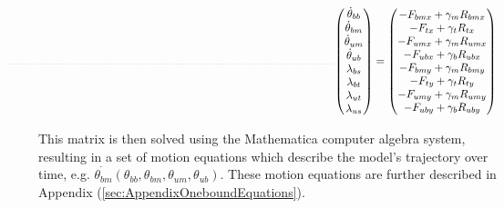 \documentclass[9pt,twoside,lineno]{pnas-new}
\begin{document}
\setstacktabbedgap{4pt}
{\tiny
  \[
  \hspace{-1.0cm}
  \resizebox{0.85\linewidth}{!}{%
    $\parenMatrixstack{
      L_s\sin\theta_{bb} & 0 & 0 & 0 & -\gamma_m (X_{bm} - X_{bb}) & \gamma_m (X_{t } - X_{bm}) & 0 & 0 \cr
      L_s\sin(\theta_{bb}) & L_t\sin(\theta_{bm}) & 0 & 0 & 0 & -\gamma_t (X_{t } - X_{bm}) & \gamma_t (X_{um} - X_{t }) & 0 \cr
      L_s\sin(\theta_{bb}) & L_t\sin(\theta_{bm}) & -L_t\sin(\theta_{um}) & 0 & 0 & 0 & -\gamma_m (X_{um} - X_{t }) & \gamma_m (X_{ub} - X_{um}) \cr
      L_s\sin(\theta_{bb}) & L_t\sin(\theta_{bm}) & -L_t\sin(\theta_{um}) & -L_s\sin(\theta_{ub}) & 0 & 0 & 0 & -\gamma_b (X_{ub} - X_{um}) \cr
      -L_s\cos(\theta_{bb}) & 0 & 0 & 0 & -\gamma_m (Y_{bm} - Y_{bb}) & \gamma_m (Y_{t } - Y_{bm}) & 0 & 0 \cr
      -L_s\cos(\theta_{bb}) & -L_t\cos(\theta_{bm}) & 0 & 0 & 0 & -\gamma_t (Y_{t } - Y_{bm}) & \gamma_t (Y_{um} - Y_{t }) & 0 \cr
      -L_s\cos(\theta_{bb}) & -L_t\cos(\theta_{bm}) & L_t\cos(\theta_{um}) & 0 & 0 & 0 & -\gamma_m (Y_{um} - Y_{t }) & \gamma_m (Y_{ub} - Y_{um}) \cr
      -L_s\cos(\theta_{bb}) & -L_t\cos(\theta_{bm}) & L_t\cos(\theta_{um}) & L_s\cos(\theta_{ub}) & 0 & 0 & 0 & -\gamma_b (Y_{ub} - Y_{um})
      }$%
    }
  \begin{pmatrix}
    \dot{\theta}_{bb}\\
    \dot{\theta}_{bm}\\
    \dot{\theta}_{um}\\
    \dot{\theta}_{ub}\\
    \lambda_{bs}\\
    \lambda_{bt}\\
    \lambda_{ut}\\
    \lambda_{us}\\
  \end{pmatrix}
  =
  \begin{pmatrix}
    -F_{bmx} + \gamma_m R_{bmx}\\
    -F_{tx} + \gamma_t R_{tx}\\
    -F_{umx} + \gamma_m R_{umx}\\
    -F_{ubx} + \gamma_b R_{ubx}\\
    -F_{bmy} + \gamma_m R_{bmy}\\
    -F_{ty} + \gamma_t R_{ty}\\
    -F_{umy} + \gamma_m R_{umy}\\
    -F_{uby} + \gamma_b R_{uby}\\
  \end{pmatrix}
  \]
}

This matrix is then solved using the Mathematica computer algebra system, resulting in a set of motion equations which describe the model's trajectory over time, e.g. $\dot{\theta_{bm}}(\theta_{bb}, \theta_{bm}, \theta_{um}, \theta_{ub})$. These motion equations are further described in Appendix (\ref{sec:AppendixOneboundEquations}).\\
\end{document}

